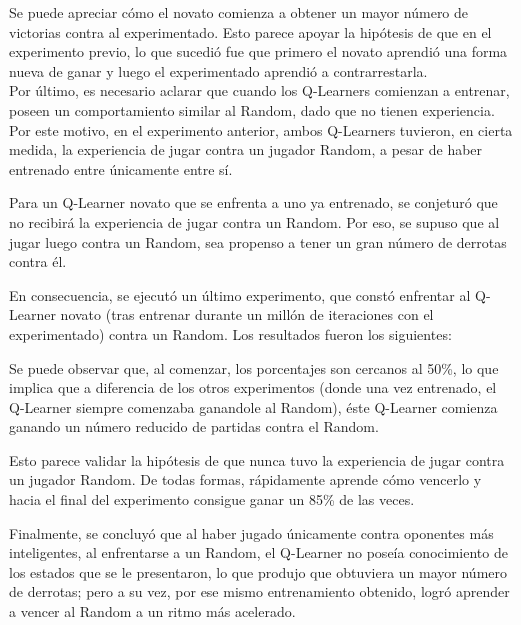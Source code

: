 Se puede apreciar cómo el novato comienza a obtener un mayor número de victorias contra al experimentado. Esto parece apoyar la hipótesis de que en el experimento previo, lo que sucedió fue que primero el novato aprendió una forma nueva de ganar y luego el experimentado aprendió a contrarrestarla.\\

Por último, es necesario aclarar que cuando los Q-Learners comienzan a entrenar, poseen un comportamiento similar al Random, dado que no tienen experiencia. Por este motivo, en el experimento anterior, ambos Q-Learners tuvieron, en cierta medida, la experiencia de jugar contra un jugador Random, a pesar de haber entrenado entre únicamente entre sí. 

Para un Q-Learner novato que se enfrenta a uno ya entrenado, se conjeturó que no recibirá la experiencia de jugar contra un Random. Por eso, se supuso que al jugar luego contra un Random, sea propenso a tener un gran número de derrotas contra él.

En consecuencia, se ejecutó un último experimento, que constó enfrentar al Q-Learner novato (tras entrenar durante un millón de iteraciones con el experimentado) contra un Random. Los resultados fueron los siguientes:



Se puede observar que, al comenzar, los porcentajes son cercanos al 50\%, lo que implica que a diferencia de los otros experimentos (donde una vez entrenado, el Q-Learner siempre comenzaba ganandole al Random), éste Q-Learner comienza ganando un número reducido de partidas contra el Random. 

Esto parece validar la hipótesis de que nunca tuvo la experiencia de jugar contra un jugador Random. De todas formas, rápidamente aprende cómo vencerlo y hacia el final del experimento consigue ganar un 85\% de las veces.

Finalmente, se concluyó que al haber jugado únicamente contra oponentes más inteligentes, al enfrentarse a un Random, el Q-Learner no poseía conocimiento de los estados que se le presentaron, lo que produjo que obtuviera un mayor número de derrotas; pero a su vez, por ese mismo entrenamiento obtenido, logró aprender a vencer al Random a un ritmo más acelerado.
